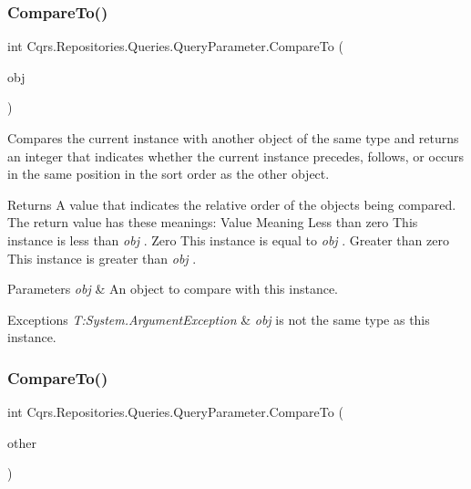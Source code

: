 \subsubsection{\texorpdfstring{Compare\+To()}{CompareTo()}\hspace{0.1cm}{\footnotesize\ttfamily [1/2]}}
{\footnotesize\ttfamily int Cqrs.\+Repositories.\+Queries.\+Query\+Parameter.\+Compare\+To (\begin{DoxyParamCaption}\item[{object}]{obj }\end{DoxyParamCaption})}



Compares the current instance with another object of the same type and returns an integer that indicates whether the current instance precedes, follows, or occurs in the same position in the sort order as the other object. 

\begin{DoxyReturn}{Returns}
A value that indicates the relative order of the objects being compared. The return value has these meanings\+: Value Meaning Less than zero This instance is less than {\itshape obj} . Zero This instance is equal to {\itshape obj} . Greater than zero This instance is greater than {\itshape obj} . 
\end{DoxyReturn}

\begin{DoxyParams}{Parameters}
{\em obj} & An object to compare with this instance. \\
\hline
\end{DoxyParams}

\begin{DoxyExceptions}{Exceptions}
{\em T\+:\+System.\+Argument\+Exception} & {\itshape obj}  is not the same type as this instance. \\
\hline
\end{DoxyExceptions}
\mbox{\label{classCqrs_1_1Repositories_1_1Queries_1_1QueryParameter_a48fa36fe6189bb03008b7f9fa3d30267_a48fa36fe6189bb03008b7f9fa3d30267}} 
\subsubsection{\texorpdfstring{Compare\+To()}{CompareTo()}\hspace{0.1cm}{\footnotesize\ttfamily [2/2]}}
{\footnotesize\ttfamily int Cqrs.\+Repositories.\+Queries.\+Query\+Parameter.\+Compare\+To (\begin{DoxyParamCaption}\item[{\hyperlink{classCqrs_1_1Repositories_1_1Queries_1_1QueryParameter}{Query\+Parameter}}]{other }\end{DoxyParamCaption})}



